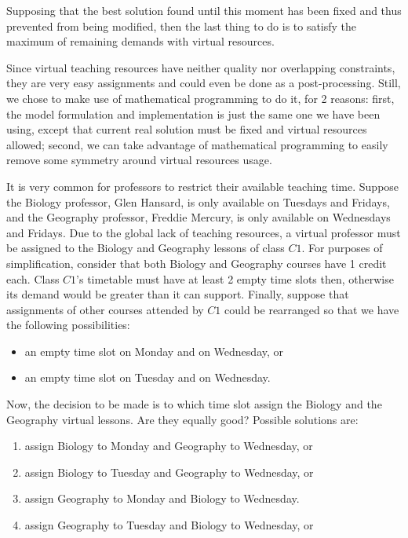 


Supposing that the best solution found until this moment has been fixed and thus prevented from being modified, then the last thing to do is to satisfy the maximum of remaining demands with virtual resources. 

Since virtual teaching resources have neither quality nor overlapping constraints, they are very easy assignments and could even be done as a post-processing. Still, we chose to make use of mathematical programming to do it, for 2 reasons: first, the model formulation and implementation is just the same one we have been using, except that current real solution must be fixed and virtual resources allowed; second, we can take advantage of mathematical programming to easily remove some symmetry around virtual resources usage.

It is very common for professors to restrict their available teaching time. Suppose the Biology professor, Glen Hansard, is only available on Tuesdays and Fridays, and the Geography professor, Freddie Mercury, is only available on Wednesdays and Fridays. Due to the global lack of teaching resources, a virtual professor must be assigned to the Biology and Geography lessons of class $C1$. For purposes of simplification, consider that both Biology and Geography courses have 1 credit each. Class $C1$'s timetable must have at least 2 empty time slots then, otherwise its demand would be greater than it can support. Finally, suppose that assignments of other courses attended by $C1$ could be rearranged so that we have the following possibilities:
\begin{itemize}
\item an empty time slot on Monday and on Wednesday, or
\item an empty time slot on Tuesday and on Wednesday.
\end{itemize}

Now, the decision to be made is to which time slot assign the Biology and the Geography virtual lessons. Are they equally good? Possible solutions are:
\begin{enumerate}
\item assign Biology to Monday and Geography to Wednesday, or \label{bmgw}
\item assign Biology to Tuesday and Geography to Wednesday, or \label{btgw}
\item assign Geography to Monday and Biology to Wednesday. \label{gmbw}
\item assign Geography to Tuesday and Biology to Wednesday, or \label{gtbw}
\end{enumerate}

